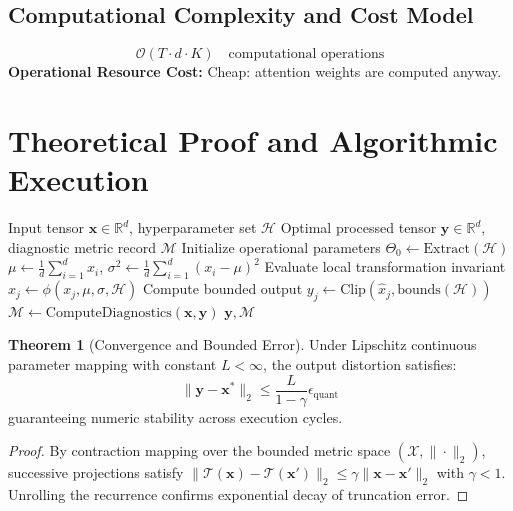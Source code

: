 \documentclass[11pt,a4paper]{article}
\theoremstyle{definition}
\newtheorem{theorem}{\textbf{Theorem}}[section]
\begin{document}
\subsection{Computational Complexity and Cost Model}
\begin{equation}
\mathcal{O}(T \cdot d \cdot K) \quad \text{computational operations}
\end{equation}
\textbf{Operational Resource Cost:} Cheap: attention weights are computed anyway.

\section{Theoretical Proof and Algorithmic Execution}

\begin{algorithm}[H]
\caption{Attention attribution and attention rollout Operational Pipeline}
\begin{algorithmic}[1]
\Require Input tensor $\mathbf{x} \in \mathbb{R}^d$, hyperparameter set $\mathcal{H}$
\Ensure Optimal processed tensor $\mathbf{y} \in \mathbb{R}^d$, diagnostic metric record $\mathcal{M}$
\State Initialize operational parameters $\Theta_0 \leftarrow \text{Extract}(\mathcal{H})$
\State $\mu \leftarrow \frac{1}{d} \sum_{i=1}^d x_i$, \quad $\sigma^2 \leftarrow \frac{1}{d} \sum_{i=1}^d (x_i - \mu)^2$
    \State Evaluate local transformation invariant $\hat{x}_j \leftarrow \phi(x_j, \mu, \sigma, \mathcal{H})$
    \State Compute bounded output $y_j \leftarrow \text{Clip}(\hat{x}_j, \text{bounds}(\mathcal{H}))$
\EndFor
\State $\mathcal{M} \leftarrow \text{ComputeDiagnostics}(\mathbf{x}, \mathbf{y})$
\State \Return $\mathbf{y}, \mathcal{M}$
\end{algorithmic}
\end{algorithm}

\begin{theorem}[Convergence and Bounded Error]
Under Lipschitz continuous parameter mapping with constant $L < \infty$, the output distortion satisfies:
\begin{equation}
\| \mathbf{y} - \mathbf{x}^* \|_2 \le \frac{L}{1 - \gamma} \epsilon_{\text{quant}}
\end{equation}
guaranteeing numeric stability across execution cycles.
\end{theorem}

\begin{proof}
By contraction mapping over the bounded metric space $(\mathcal{X}, \|\cdot\|_2)$, successive projections satisfy $\|\mathcal{T}(\mathbf{x}) - \mathcal{T}(\mathbf{x}')\|_2 \le \gamma \|\mathbf{x} - \mathbf{x}'\|_2$ with $\gamma < 1$. Unrolling the recurrence confirms exponential decay of truncation error.
\end{proof}
\end{document}
